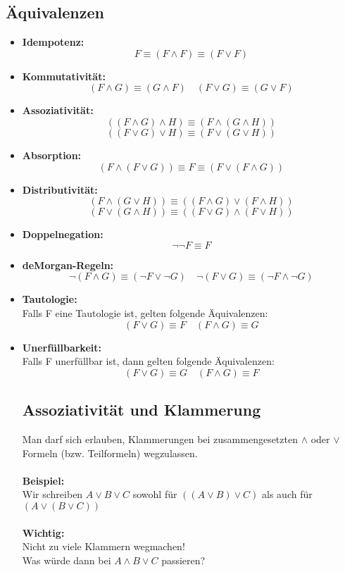 \documentclass{article}
\begin{document}
	\subsection{Äquivalenzen}
	\begin{itemize}
		\item \textbf{Idempotenz: }\\
		\[F \equiv (F \wedge F) \equiv (F \vee F)\]
		\item \textbf{Kommutativität: }\\
		\[(F\wedge G) \equiv (G \wedge F) \quad (F \vee G) \equiv (G \vee F)\]
		\item \textbf{Assoziativität:} \\
		\[((F \wedge G) \wedge H) \equiv (F \wedge (G \wedge H))\]
		\[((F \vee G) \vee H) \equiv (F \vee (G \vee H))\]
		\item \textbf{Absorption:} \\
		\[(F \wedge (F \vee G)) \equiv F \equiv (F \vee (F \wedge G))\]
		\item \textbf{Distributivität:}\\
		\[(F \wedge (G \vee H)) \equiv ((F \wedge G) \vee (F \wedge H))\]
		\[(F \vee(G \wedge H)) \equiv ((F \vee G) \wedge (F \vee H)) \]
		\item \textbf{Doppelnegation:}\\
		\[\neg\neg F \equiv F\]
		\item \textbf{deMorgan-Regeln:}\\
		\[\neg(F \wedge G)\equiv (\neg F \vee \neg G) \quad \neg(F \vee G) \equiv (\neg F \wedge \neg G)\]
		\item \textbf{Tautologie:}\\
		Falls F eine Tautologie ist, gelten folgende Äquivalenzen: \\
		\[(F \vee G) \equiv F \quad (F \wedge G) \equiv G\]
		\item \textbf{Unerfüllbarkeit:}\\
		Falls F unerfüllbar ist, dann gelten folgende Äquivalenzen:\\
		\[(F \vee G) \equiv G \quad (F \wedge G) \equiv F\]
		\subsection{Assoziativität und Klammerung}
		Man darf sich erlauben, Klammerungen bei zusammengesetzten $\wedge$ oder $\vee$ Formeln (bzw. Teilformeln) wegzulassen. \\
		\\
		\textbf{Beispiel:} \\
		Wir schreiben $A \vee B \vee C$ sowohl für $((A \vee B) \vee C)$ als auch für $(A \vee (B \vee C))$ \\
		\\
		\textbf{Wichtig:} \\
		Nicht zu viele Klammern wegmachen! \\
		Was würde dann bei $A \wedge B \vee C$ passieren? \\

\end{itemize}
\end{document}
